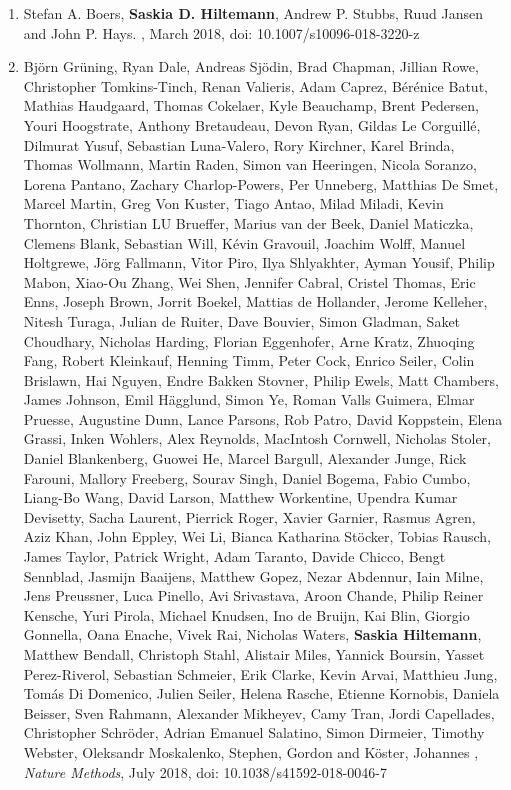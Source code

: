 \begin{enumerate}
\item Stefan A. Boers, \textbf{Saskia D. Hiltemann}, Andrew P. Stubbs, Ruud Jansen and John P. Hays. {\color{chaptergrey}{Development and evaluation of a culture-free microbiota profiling platform (MYcrobiota) for clinical diagnostics}}, March 2018, doi: 10.1007/s10096-018-3220-z \label{MYcrobiota}

\item Björn Grüning, Ryan  Dale, Andreas  Sjödin, Brad  Chapman, Jillian  Rowe, Christopher  Tomkins-Tinch, Renan  Valieris, Adam  Caprez, Bérénice  Batut, Mathias  Haudgaard, Thomas  Cokelaer, Kyle  Beauchamp, Brent  Pedersen, Youri  Hoogstrate, Anthony  Bretaudeau, Devon  Ryan, Gildas  Le Corguillé, Dilmurat  Yusuf, Sebastian  Luna-Valero, Rory  Kirchner, Karel  Brinda, Thomas  Wollmann, Martin  Raden, Simon  van Heeringen, Nicola  Soranzo, Lorena  Pantano, Zachary  Charlop-Powers, Per  Unneberg, Matthias  De Smet, Marcel  Martin, Greg  Von Kuster, Tiago  Antao, Milad  Miladi, Kevin  Thornton, Christian LU   Brueffer, Marius  van der Beek, Daniel  Maticzka, Clemens  Blank, Sebastian  Will, Kévin  Gravouil, Joachim  Wolff, Manuel  Holtgrewe, Jörg  Fallmann, Vitor  Piro, Ilya  Shlyakhter, Ayman  Yousif, Philip  Mabon, Xiao-Ou  Zhang, Wei  Shen, Jennifer  Cabral, Cristel  Thomas, Eric  Enns, Joseph  Brown, Jorrit  Boekel, Mattias  de Hollander, Jerome  Kelleher, Nitesh  Turaga, Julian  de Ruiter, Dave  Bouvier, Simon  Gladman, Saket  Choudhary, Nicholas  Harding, Florian  Eggenhofer, Arne  Kratz, Zhuoqing  Fang, Robert  Kleinkauf, Henning  Timm, Peter  Cock, Enrico  Seiler, Colin  Brislawn, Hai  Nguyen, Endre  Bakken Stovner, Philip  Ewels, Matt  Chambers, James  Johnson, Emil  Hägglund, Simon  Ye, Roman  Valls Guimera, Elmar  Pruesse, Augustine  Dunn, Lance  Parsons, Rob  Patro, David  Koppstein, Elena  Grassi, Inken  Wohlers, Alex  Reynolds, MacIntosh  Cornwell, Nicholas  Stoler, Daniel  Blankenberg, Guowei  He, Marcel  Bargull, Alexander  Junge, Rick  Farouni, Mallory  Freeberg, Sourav  Singh, Daniel  Bogema, Fabio  Cumbo, Liang-Bo  Wang, David  Larson, Matthew  Workentine, Upendra  Kumar Devisetty, Sacha  Laurent, Pierrick  Roger, Xavier  Garnier, Rasmus  Agren, Aziz  Khan, John  Eppley, Wei  Li, Bianca Katharina  Stöcker, Tobias  Rausch, James  Taylor, Patrick  Wright, Adam  Taranto, Davide  Chicco, Bengt  Sennblad, Jasmijn  Baaijens, Matthew  Gopez, Nezar  Abdennur, Iain  Milne, Jens  Preussner, Luca  Pinello, Avi  Srivastava, Aroon  Chande, Philip Reiner  Kensche, Yuri  Pirola, Michael  Knudsen, Ino  de Bruijn, Kai  Blin, Giorgio  Gonnella, Oana  Enache, Vivek  Rai, Nicholas  Waters, \textbf{Saskia Hiltemann}, Matthew Bendall, Christoph  Stahl, Alistair  Miles, Yannick  Boursin, Yasset  Perez-Riverol, Sebastian  Schmeier, Erik  Clarke, Kevin  Arvai, Matthieu  Jung, Tomás  Di Domenico, Julien  Seiler, Helena  Rasche, Etienne  Kornobis, Daniela  Beisser, Sven  Rahmann, Alexander  Mikheyev, Camy  Tran, Jordi  Capellades, Christopher  Schröder, Adrian Emanuel  Salatino, Simon  Dirmeier, Timothy  Webster, Oleksandr  Moskalenko, Stephen, Gordon and Köster, Johannes {\color{chaptergrey}{Bioconda: A sustainable and comprehensive software distribution for the life sciences.}}, \textit{Nature Methods}, July 2018, doi: 10.1038/s41592-018-0046-7


\end{enumerate}
